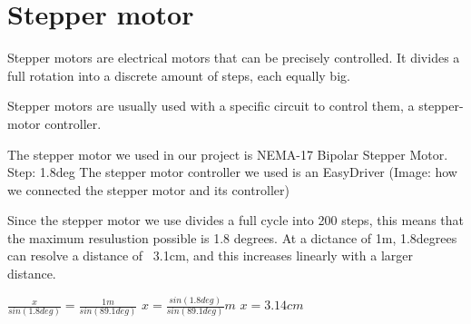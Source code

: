 \clearpage
\section{Stepper motor}
Stepper motors are electrical motors that can be precisely controlled.
It divides a full rotation into a discrete amount of steps, each equally big.

Stepper motors are usually used with a specific circuit to control them, a stepper-motor controller.

The stepper motor we used in our project is NEMA-17 Bipolar Stepper Motor.
Step: 1.8deg
\cite{steppermotor}
The stepper motor controller we used is an EasyDriver
\cite{steppercontroller}
(Image: how we connected the stepper motor and its controller)

Since the stepper motor we use divides a full cycle into 200 steps, this means that the maximum resulustion possible is 1.8 degrees. At a dictance of 1m, 1.8degrees can resolve a distance of ~3.1cm, and this increases linearly with a larger distance.

$\frac{x}{sin(1.8deg)} = \frac{1m}{sin(89.1deg)}$
$x = \frac{sin(1.8deg)}{sin(89.1deg)}m$
$x = 3.14cm$
